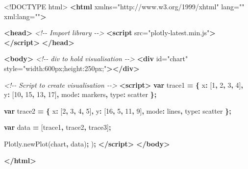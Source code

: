 \documentclass[
]{krantz}
\makeatletter
\newenvironment{Shaded}{\begin{snugshade}}{\end{snugshade}}
\newcommand{\AttributeTok}[1]{\textcolor[rgb]{0.61,0.61,0.61}{#1}}
\newcommand{\CommentTok}[1]{\textcolor[rgb]{0.37,0.37,0.37}{\textit{#1}}}
\newcommand{\DataTypeTok}[1]{\textcolor[rgb]{0.27,0.27,0.27}{#1}}
\newcommand{\DecValTok}[1]{\textcolor[rgb]{0.06,0.06,0.06}{#1}}
\newcommand{\KeywordTok}[1]{\textcolor[rgb]{0.27,0.27,0.27}{\textbf{#1}}}
\newcommand{\NormalTok}[1]{#1}
\newcommand{\OperatorTok}[1]{\textcolor[rgb]{0.43,0.43,0.43}{\textbf{#1}}}
\newcommand{\OtherTok}[1]{\textcolor[rgb]{0.37,0.37,0.37}{#1}}
\newcommand{\StringTok}[1]{\textcolor[rgb]{0.5,0.5,0.5}{#1}}
\newcommand{\VariableTok}[1]{\textcolor[rgb]{0,0,0}{#1}}
\newenvironment{kframe}{%
\medskip{}
\setlength{\fboxsep}{.8em}
 \def\at@end@of@kframe{}%
 \ifinner\ifhmode%
  \def\at@end@of@kframe{\end{minipage}}%
  \begin{minipage}{\columnwidth}%
 \fi\fi%
 \def\FrameCommand##1{\hskip\@totalleftmargin \hskip-\fboxsep
 \colorbox{shadecolor}{##1}\hskip-\fboxsep
     \hskip-\linewidth \hskip-\@totalleftmargin \hskip\columnwidth}%
 \MakeFramed {\advance\hsize-\width
   \@totalleftmargin\z@ \linewidth\hsize
   \@setminipage}}%
 {\par\unskip\endMakeFramed%
 \at@end@of@kframe}
\renewenvironment{Shaded}{\begin{kframe}}{\end{kframe}}
\makeatother
\begin{document}
\begin{Shaded}
\begin{Highlighting}[]
\DataTypeTok{<!DOCTYPE }\NormalTok{html}\DataTypeTok{>}
\KeywordTok{<html}\OtherTok{ xmlns=}\StringTok{"http://www.w3.org/1999/xhtml"}\OtherTok{ lang=}\StringTok{""}\OtherTok{ xml:lang=}\StringTok{""}\KeywordTok{>}

\KeywordTok{<head>}
  \CommentTok{<!{-}{-} Import library {-}{-}>}
  \KeywordTok{<script}\OtherTok{ src=}\StringTok{"plotly{-}latest.min.js"}\KeywordTok{></script>}
\KeywordTok{</head>}

\KeywordTok{<body>}
  \CommentTok{<!{-}{-} div to hold visualisation {-}{-}>}
  \KeywordTok{<div}\OtherTok{ id=}\StringTok{"chart"}\OtherTok{ style=}\StringTok{"width:600px;height:250px;"}\KeywordTok{></div>}

  \CommentTok{<!{-}{-} Script to create visualisation {-}{-}>}
  \KeywordTok{<script>}
    \KeywordTok{var}\NormalTok{ trace1 }\OperatorTok{=} \OperatorTok{\{}
      \DataTypeTok{x}\OperatorTok{:}\NormalTok{ [}\DecValTok{1}\OperatorTok{,} \DecValTok{2}\OperatorTok{,} \DecValTok{3}\OperatorTok{,} \DecValTok{4}\NormalTok{]}\OperatorTok{,}
      \DataTypeTok{y}\OperatorTok{:}\NormalTok{ [}\DecValTok{10}\OperatorTok{,} \DecValTok{15}\OperatorTok{,} \DecValTok{13}\OperatorTok{,} \DecValTok{17}\NormalTok{]}\OperatorTok{,}
      \DataTypeTok{mode}\OperatorTok{:} \StringTok{\textquotesingle{}markers\textquotesingle{}}\OperatorTok{,}
      \DataTypeTok{type}\OperatorTok{:} \StringTok{\textquotesingle{}scatter\textquotesingle{}}
    \OperatorTok{\};}

    \KeywordTok{var}\NormalTok{ trace2 }\OperatorTok{=} \OperatorTok{\{}
      \DataTypeTok{x}\OperatorTok{:}\NormalTok{ [}\DecValTok{2}\OperatorTok{,} \DecValTok{3}\OperatorTok{,} \DecValTok{4}\OperatorTok{,} \DecValTok{5}\NormalTok{]}\OperatorTok{,}
      \DataTypeTok{y}\OperatorTok{:}\NormalTok{ [}\DecValTok{16}\OperatorTok{,} \DecValTok{5}\OperatorTok{,} \DecValTok{11}\OperatorTok{,} \DecValTok{9}\NormalTok{]}\OperatorTok{,}
      \DataTypeTok{mode}\OperatorTok{:} \StringTok{\textquotesingle{}lines\textquotesingle{}}\OperatorTok{,}
      \DataTypeTok{type}\OperatorTok{:} \StringTok{\textquotesingle{}scatter\textquotesingle{}}
    \OperatorTok{\};}

    \KeywordTok{var}\NormalTok{ data }\OperatorTok{=}\NormalTok{ [trace1}\OperatorTok{,}\NormalTok{ trace2}\OperatorTok{,}\NormalTok{ trace3]}\OperatorTok{;}

    \VariableTok{Plotly}\NormalTok{.}\AttributeTok{newPlot}\NormalTok{(}\StringTok{\textquotesingle{}chart\textquotesingle{}}\OperatorTok{,}\NormalTok{ data)}\OperatorTok{;}
\NormalTok{    )}\OperatorTok{;}
  \KeywordTok{</script>}
\KeywordTok{</body>}

\KeywordTok{</html>}
\end{Highlighting}
\end{Shaded}
\end{document}
